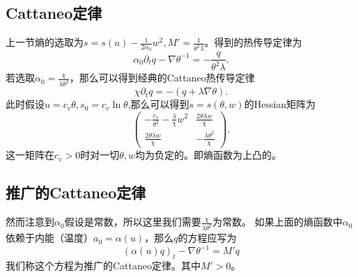 \documentclass{article}
\begin{document}
\subsection{Cattaneo定律}
上一节熵的选取为$s = s( u)  -\frac{1}{2 \alpha_0} w^2, M' = \frac{1}{\theta^2 \lambda} $。得到的热传导定律为
\begin{equation*}
	\alpha_0 \partial_t q  - \nabla \theta^{-1} = -\frac{q}{\theta^2 \lambda}.
\end{equation*}
若选取$\alpha_0 = \frac{\chi}{\lambda\theta^2}$，那么可以得到经典的Cattaneo热传导定律
\begin{equation*}
	 \chi  \partial_t q = - (q +\lambda \nabla \theta).
\end{equation*}
此时假设$u = c_v \theta, s_0 = c_v \ln \theta$,那么可以得到$s = s (\theta,w)$的Hessian矩阵为
\begin{equation*}
	\left( \begin{array}{cc} 
		-\frac{c_v}{\theta^2} - \frac{\lambda}{\chi} w^2 & \frac{2 \theta \lambda w }{\chi} \\
		\frac{2 \theta \lambda w }{\chi}  & -\frac{\lambda \theta^2}{\chi }
	\end{array} \right).
\end{equation*}
 这一矩阵在$c_v >0$时对一切$\theta, w$均为负定的。即熵函数为上凸的。

\subsection{推广的Cattaneo定律}
 然而注意到$\alpha_0$假设是常数，所以这里我们需要$\frac{\chi}{\lambda \theta^2}$为常数。
如果上面的熵函数中$\alpha_0$依赖于内能（温度）$a_0=\alpha(u)$，那么$q$的方程应写为
\begin{equation*}
({\alpha(u)}{q})_t-\nabla \theta^{-1}= M'{q}
\end{equation*}
我们称这个方程为推广的Cattaneo定律。其中$M'>0$。
\end{document}
